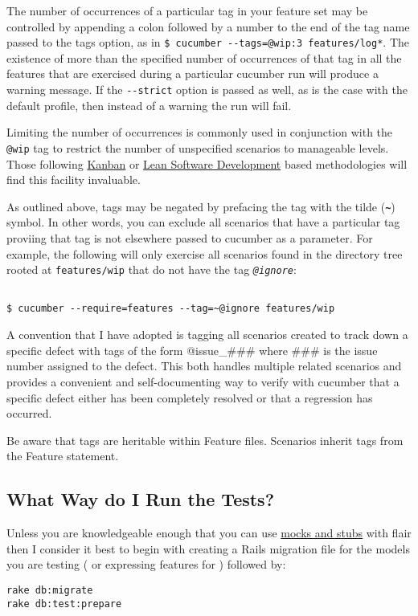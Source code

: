 The number of occurrences of a particular tag in your feature set may be controlled by appending a colon followed by a number to the end of the tag name passed to the tags option, as in \verb+$ cucumber --tags=@wip:3 features/log*+.  The existence of more than the specified number of occurrences of that tag in all the features that are exercised during a particular cucumber run will produce a warning message.  If the \verb+--strict+ option is passed as well, as is the case with the default profile, then instead of a warning the run will fail.

Limiting the number of occurrences is commonly used in conjunction with the \verb+@wip+ tag to restrict the number of unspecified scenarios to manageable levels.  Those following \href{http://en.wikipedia.org/wiki/kanban}{Kanban} or \href{http://en.wikipedia.org/wiki/Lean_software_development}{Lean Software Development} based methodologies will find this facility invaluable.

As outlined above, tags may be negated by prefacing the tag with the tilde (\textbf{\verb+~+}) symbol.  In other words, you can exclude all scenarios that have a particular tag proviing that tag is not elsewhere passed to cucumber as a parameter.  For example, the following will only exercise all scenarios found in the directory tree rooted at \verb+features/wip+ that do not have the tag \emph{\verb+@ignore+}:

\begin{verbatim}

$ cucumber --require=features --tag=~@ignore features/wip

\end{verbatim}
A convention that I have adopted is tagging all scenarios created to track down a specific defect with tags of the form @issue\_\#\#\# where \#\#\# is the issue number assigned to the defect.  This both handles multiple related scenarios and provides a convenient and self-documenting way to verify with cucumber that a specific defect either has been completely resolved or that a regression has occurred.

Be aware that tags are heritable within Feature files.  Scenarios inherit tags from the Feature statement.

\subsection{What Way do I Run the Tests?}

Unless you are knowledgeable enough that you can use \href{http://rspec.info/documentation/mocks/}{mocks and stubs} with flair then I consider it best to begin with creating a Rails migration file for the models you are testing ( or expressing features for ) followed by:
\begin{verbatim}
rake db:migrate
rake db:test:prepare

\end{verbatim}

